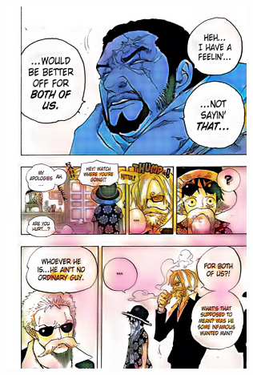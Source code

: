 \begin{figure}[hbtp]
    \centering
    \begin{subfigure}[b]{0.48\textwidth}
        \includegraphics[width=\textwidth]{chapter/actual/ac3.png}
    \end{subfigure}
    \hfill
    \begin{subfigure}[b]{0.45\textwidth}

\end{subfigure}
\end{figure}
